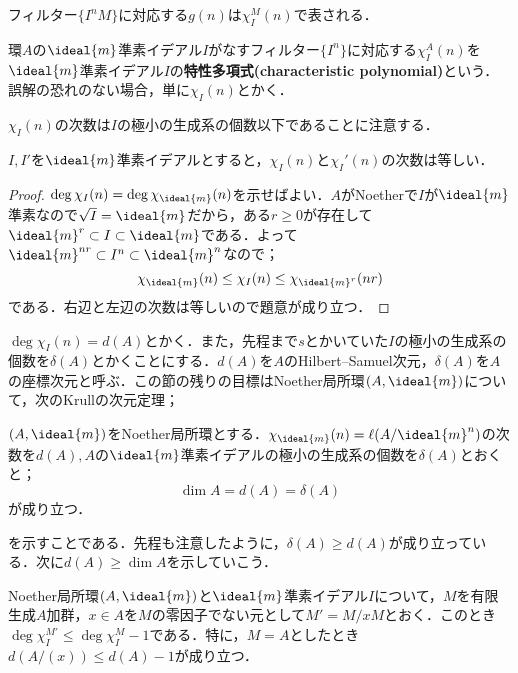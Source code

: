 フィルター$\{I^n M\}$に対応する$g(n)$は$\chi_I^M(n)$で表される．

\begin{defi}[特性多項式]
	環$A$の$\ideal{m}$準素イデアル$I$がなすフィルター$\{I^n\}$に対応する$\chi_I^A(n)$を$\ideal{m}$準素イデアル$I$の\textbf{特性多項式(characteristic polynomial)}という．誤解の恐れのない場合，単に$\chi_I(n)$とかく．
\end{defi}

$\chi_I(n)$の次数は$I$の極小の生成系の個数以下であることに注意する．

\begin{prop}
	$I,I'$を$\ideal{m}$準素イデアルとすると，$\chi_I(n)$と$\chi_I'(n)$の次数は等しい．
\end{prop}

\begin{proof}
	$\deg\chi_I(n)=\deg\chi_{\ideal{m}}(n)$を示せばよい．$A$がNoetherで$I$が$\ideal{m}$準素なので$\sqrt{I}=\ideal{m}$だから，ある$r\geq0$が存在して$\ideal{m}^r\subset I\subset\ideal{m}$である．よって$\ideal{m}^{nr}\subset I^n\subset\ideal{m}^n$なので；
	\[\chi_{\ideal{m}}(n)\leq\chi_I(n)\leq\chi_{\ideal{m}^r}(nr)\]
	である．右辺と左辺の次数は等しいので題意が成り立つ．
\end{proof}

$\deg\chi_I(n)=d(A)$とかく．また，先程まで$s$とかいていた$I$の極小の生成系の個数を$\delta(A)$とかくことにする．$d(A)$を$A$のHilbert--Samuel次元，$\delta(A)$を$A$の座標次元と呼ぶ．この節の残りの目標はNoether局所環$(A,\ideal{m})$について，次のKrullの次元定理；
\begin{thm}[Krullの次元定理]\label{thm:Krullの次元定理}
	$(A,\ideal{m})$をNoether局所環とする．$\chi_{\ideal{m}}(n)=\ell(A/\ideal{m}^n)$の次数を$d(A),A$の$\ideal{m}$準素イデアルの極小の生成系の個数を$\delta(A)$とおくと；
	\[\dim A=d(A)=\delta(A)\]
	が成り立つ．
\end{thm}

を示すことである．先程も注意したように，$\delta(A)\geq d(A)$が成り立っている．次に$d(A)\geq\dim A$を示していこう．

\begin{lem}\label{lem:商の特性多項式を上から抑える}
	Noether局所環$(A,\ideal{m})$と$\ideal{m}$準素イデアル$I$について，$M$を有限生成$A$加群，$x\in A$を$M$の零因子でない元として$M'=M/xM$とおく．このとき$\deg\chi_I^{M'}\leq\deg\chi_I^M-1$である．特に，$M=A$としたとき$d(A/(x))\leq d(A)-1$が成り立つ．
\end{lem}

